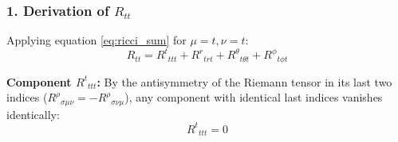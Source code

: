 \documentclass[11pt, a4paper]{report}
\begin{document}
\subsubsection*{1. Derivation of $R_{tt}$}

Applying equation \eqref{eq:ricci_sum} for $\mu=t, \nu=t$:
\begin{equation}
    R_{tt} = {R^t}_{ttt} + {R^r}_{trt} + {R^\theta}_{t\theta t} + {R^\phi}_{t\phi t}
\end{equation}

\textbf{Component ${R^t}_{ttt}$:}
By the antisymmetry of the Riemann tensor in its last two indices (${R^\rho}_{\sigma\mu\nu} = -{R^\rho}_{\sigma\nu\mu}$), any component with identical last indices vanishes identically:
\begin{equation}
    {R^t}_{ttt} = 0
\end{equation}
\end{document}

